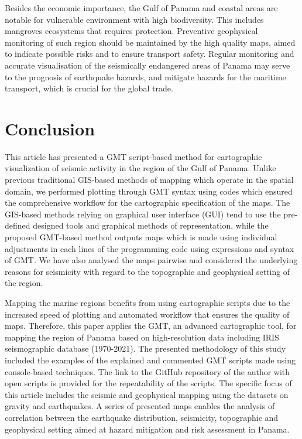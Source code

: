 \documentclass[USenglish,twocolumn]{article}
\begin{document}
Besides the economic importance, the Gulf of Panama and coastal areas are notable for vulnerable environment with high biodiversity. This includes mangroves ecosystems that requires protection. Preventive geophysical monitoring of such region should be maintained by the high quality maps, aimed to indicate possible risks and to ensure transport safety. Regular monitoring and accurate visualisation of the seismically endangered areas of Panama may serve to the prognosis of earthquake hazards, and mitigate hazards for the maritime transport, which is crucial for the global trade. 

\section{Conclusion}

This article has presented a GMT script-based method for cartographic visualization of seismic activity in the region of the Gulf of Panama. Unlike previous traditional GIS-based methods of mapping which operate in the spatial domain, we performed plotting through GMT syntax using codes which ensured the comprehensive workflow for the cartographic specification of the maps. The GIS-based methods relying on graphical user interface (GUI) tend to use the pre-defined designed tools and graphical methods of representation, while the proposed GMT-based method outputs maps which is made using individual adjustments in each lines of the programming code using expressions and syntax of GMT. We have also analysed the maps pairwise and considered the underlying reasons for seismicity with regard to the topographic and geophysical setting of the region.

Mapping the marine regions benefits from using cartographic scripts due to the increased speed of plotting and automated workflow that ensures the quality of maps. Therefore, this paper applies the GMT, an advanced cartographic tool, for mapping the region of Panama based on high-resolution data including IRIS seismographic database (1970-2021). The presented methodology of this study included the examples of the explained and commented GMT scripts made using console-based techniques. The link to the GitHub repository of the author with open scripts is provided for the repeatability of the scripts. The specific focus of this article includes the seismic and geophysical mapping using the datasets on gravity and earthquakes. A series of presented maps enables the analysis of correlation between the earthquake distribution, seismicity, topographic and geophysical setting aimed at hazard mitigation and risk assessment in Panama.
\end{document}
